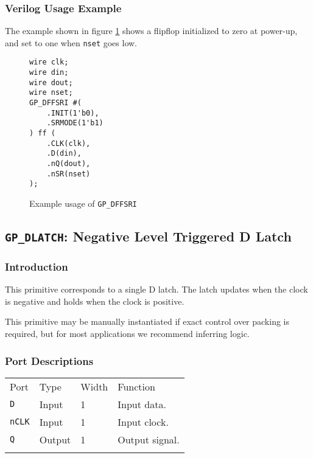 \documentclass[11pt]{article}
\newcommand{\tokenstyle}[1]{\texttt{#1}}
\newcommand{\wirestyle}[1]{\texttt{#1}}
\newcommand{\whenstyle}[1]{{\fontseries{sb}\selectfont#1}}
\newcommand{\thinhline}{\Xhline{1\arrayrulewidth}}
\newcommand{\thickhline}{\Xhline{2.5\arrayrulewidth}}
\begin{document}
\subsubsection{Verilog Usage Example}

The example shown in figure \ref{gp-dffsri-example} shows a flipflop initialized to zero at power-up, and set to one
when \wirestyle{nset} goes low.

\begin{figure}[h]
\begin{lstlisting}
wire clk;
wire din;
wire dout;
wire nset;
GP_DFFSRI #(
	.INIT(1'b0),
	.SRMODE(1'b1)
) ff (
	.CLK(clk),
	.D(din),
	.nQ(dout),
	.nSR(nset)
);
\end{lstlisting}
\caption{Example usage of \tokenstyle{GP\_DFFSRI}}
\label{gp-dffsri-example}
\end{figure}


\pagebreak
\subsection{\tokenstyle{GP\_DLATCH}: Negative Level Triggered D Latch}
\label{gp-latch}

\subsubsection{Introduction}
This primitive corresponds to a single D latch. The latch updates when the clock is negative and holds
when the clock is positive.

This primitive may be manually instantiated if exact control over packing is required, but for most applications we
recommend inferring logic.

\subsubsection{Port Descriptions}

\begin{tabularx}{\textwidth}{lllX}
\thinhline
\whenstyle{Port} & \whenstyle{Type} & \whenstyle{Width} & \whenstyle{Function} \\
\thickhline
\tokenstyle{D} & Input & 1 & Input data. \\
\thinhline
\tokenstyle{nCLK} & Input & 1 & Input clock. \\
\thinhline
\tokenstyle{Q} & Output & 1 & Output signal. \\
\thinhline
\end{tabularx}
\end{document}
